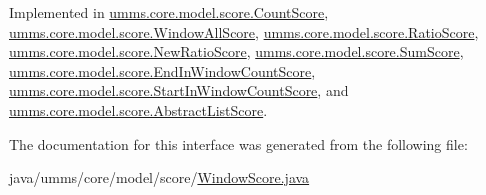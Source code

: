 Implemented in \hyperlink{classumms_1_1core_1_1model_1_1score_1_1_count_score_a1308c7c7d75f339947c29575099d41c3}{umms.\+core.\+model.\+score.\+Count\+Score}, \hyperlink{classumms_1_1core_1_1model_1_1score_1_1_window_all_score_a43b3c23abd2ac3c3bd49691656048433}{umms.\+core.\+model.\+score.\+Window\+All\+Score}, \hyperlink{classumms_1_1core_1_1model_1_1score_1_1_ratio_score_a65ac8a6fe0603eb99cd0ba1de0302097}{umms.\+core.\+model.\+score.\+Ratio\+Score}, \hyperlink{classumms_1_1core_1_1model_1_1score_1_1_new_ratio_score_abc8dd462110ee0768011709ea84b9346}{umms.\+core.\+model.\+score.\+New\+Ratio\+Score}, \hyperlink{classumms_1_1core_1_1model_1_1score_1_1_sum_score_af2ac743d89d631a5f6bf69d6bd74db8a}{umms.\+core.\+model.\+score.\+Sum\+Score}, \hyperlink{classumms_1_1core_1_1model_1_1score_1_1_end_in_window_count_score_a54e9f7ec3a667641fab13fa15b162f7c}{umms.\+core.\+model.\+score.\+End\+In\+Window\+Count\+Score}, \hyperlink{classumms_1_1core_1_1model_1_1score_1_1_start_in_window_count_score_ac19f44fe80ce3d2ad0c236bb62d67c5c}{umms.\+core.\+model.\+score.\+Start\+In\+Window\+Count\+Score}, and \hyperlink{classumms_1_1core_1_1model_1_1score_1_1_abstract_list_score_a2927a97c83af8b901402b0c84c414a07}{umms.\+core.\+model.\+score.\+Abstract\+List\+Score}.



The documentation for this interface was generated from the following file\+:\begin{DoxyCompactItemize}
\item 
java/umms/core/model/score/\hyperlink{_window_score_8java}{Window\+Score.\+java}\end{DoxyCompactItemize}
